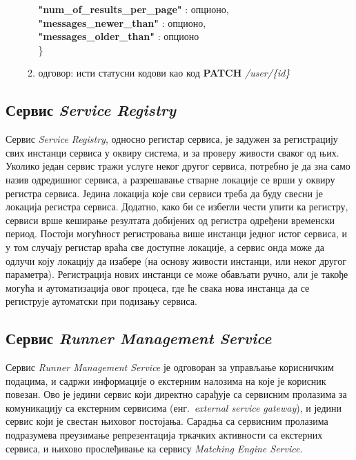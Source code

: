 \documentclass[12pt,oneside]{memoir}
\begin{document}
\begin{enumerate}
\begin{enumerate}
                    \hspace*{1cm} \textbf{"num\_of\_results\_per\_page"} : опционо,\\
                    \hspace*{1cm} \textbf{"messages\_newer\_than"} : опционо,\\
                    \hspace*{1cm} \textbf{"messages\_older\_than"} : опционо\\
                \}
            \item одговор: исти статусни кодови као код \textbf{PATCH} \textit{/user/\{id\}}
        \end{enumerate}
\end{enumerate}

\subsection{Сервис \textit{Service Registry}}
Сервис \textit{Service Registry}, односно регистар сервиса, је задужен за регистрацију свих инстанци сервиса у оквиру система, и за проверу живости сваког од њих. Уколико један сервис тражи услуге неког другог сервиса, потребно је да зна само назив одредишног сервиса, а разрешавање стварне локације се врши у оквиру регистра сервиса. Једина локација које сви сервиси треба да буду свесни је локација регистра сервиса. Додатно, како би се избегли чести упити ка регистру, сервиси врше кеширање резултата добијених од регистра одређени временски период. Постоји могућност регистровања више инстанци једног истог сервиса, и у том случају регистар враћа све доступне локације, а сервис онда може да одлучи коју локацију да изабере (на основу живости инстанци, или неког другог параметра). Регистрација нових инстанци се може обављати ручно, али је такође могућа и аутоматизација овог процеса, где ће свака нова инстанца да се региструје аутоматски при подизању сервиса.

\subsection{Сервис \textit{Runner Management Service}}
Сервис \textit{Runner Management Service} је одговоран за управљање корисничким подацима, и садржи информације о екстерним налозима на које је корисник повезан. Ово је једини сервис који директно сарађује са сервисним пролазима за комуникацију са екстерним сервисима (енг.~\textit{external service gateway}), и једини сервис који је свестан њиховог постојања. Сарадња са сервисним пролазима подразумева преузимање репрезентација тркачких активности са екстерних сервиса, и њихово прослеђивање ка сервису \textit{Matching Engine Service}.
\end{document}
